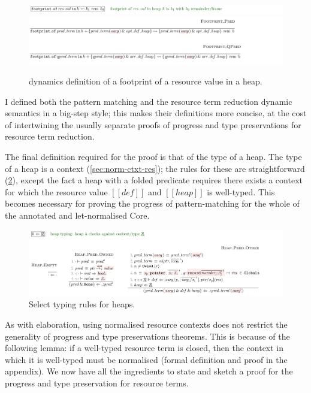 \begin{figure}
    \includegraphics{figures/kernel-dynamics-footprint-1}
    \includegraphics{figures/kernel-dynamics-footprint-2}
    \caption{ dynamics definition of a footprint of a resource
        value in a heap.}\label{fig:kernel-footprint}
\end{figure}

I defined both the pattern matching and the resource term reduction dynamic
semantics in a big-step style; this makes their definitions more concise,
at the cost of intertwining the usually separate proofs of progress and type
preservations for resource term reduction.

The final definition required for the proof is that of the type of a heap. The
type of a heap is a  context
(\cref{sec:norm-ctxt-res}); the rules for these are straightforward
(\cref{fig:kernel-heap-typing}), except the fact a heap with a folded predicate
requires there exists a context for which the resource value $[[ def ]]$ and
$[[ heap ]]$ is well-typed. This becomes necessary for proving the progress of
pattern-matching for the whole of the annotated and let-normalised Core.

\begin{figure}
    \includegraphics{figures/kernel-heap-typing}
    \caption{Select typing rules for heaps.}\label{fig:kernel-heap-typing}
\end{figure}

As with elaboration, using normalised resource contexts does not restrict the
generality of progress and type preservations theorems. This is because of the
following lemma: if a well-typed resource term is closed, then the context in
which it is well-typed must be normalised (formal definition and proof in the
appendix). We now have all the ingredients to state and sketch a proof for the
progress and type preservation for resource terms.

